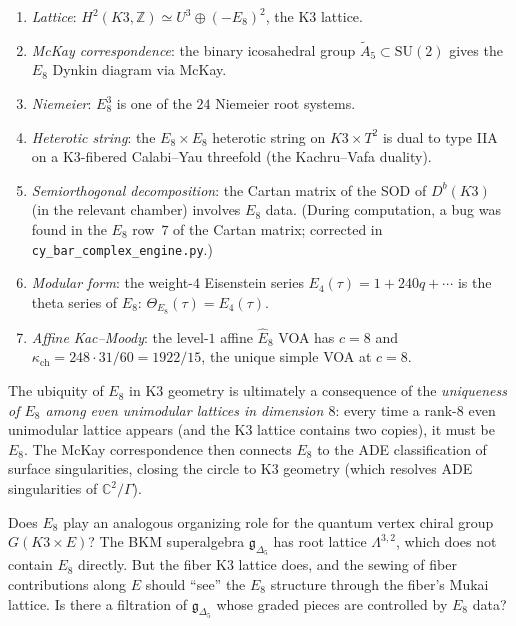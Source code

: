 \documentclass[11pt]{article}
\newcommand{\fg}{\mathfrak{g}}
\newcommand{\C}{\mathbb{C}}
\newcommand{\Z}{\mathbb{Z}}
\begin{document}
\begin{enumerate}[label=(\roman*)]
\item \emph{Lattice}: $H^2(K3, \Z) \simeq U^3 \oplus (-E_8)^2$, the K3 lattice.
\item \emph{McKay correspondence}: the binary icosahedral group $\widetilde{A}_5 \subset \mathrm{SU}(2)$ gives the $E_8$ Dynkin diagram via McKay.
\item \emph{Niemeier}: $E_8^3$ is one of the $24$ Niemeier root systems.
\item \emph{Heterotic string}: the $E_8 \times E_8$ heterotic string on $K3 \times T^2$ is dual to type IIA on a K3-fibered Calabi--Yau threefold (the Kachru--Vafa duality).
\item \emph{Semiorthogonal decomposition}: the Cartan matrix of the SOD of $D^b(K3)$ (in the relevant chamber) involves $E_8$ data. (During computation, a bug was found in the $E_8$ row~$7$ of the Cartan matrix; corrected in \texttt{cy\_bar\_complex\_engine.py}.)
\item \emph{Modular form}: the weight-$4$ Eisenstein series $E_4(\tau) = 1 + 240 q + \cdots$ is the theta series of $E_8$: $\Theta_{E_8}(\tau) = E_4(\tau)$.
\item \emph{Affine Kac--Moody}: the level-$1$ affine $\widehat{E}_8$ VOA has $c = 8$ and $\kappa_{\mathrm{ch}} = 248 \cdot 31/60 = 1922/15$, the unique simple VOA at $c = 8$.
\end{enumerate}

The ubiquity of $E_8$ in K3 geometry is ultimately a consequence of the \emph{uniqueness of $E_8$ among even unimodular lattices in dimension $8$}: every time a rank-$8$ even unimodular lattice appears (and the K3 lattice contains two copies), it must be $E_8$. The McKay correspondence then connects $E_8$ to the ADE classification of surface singularities, closing the circle to K3 geometry (which resolves ADE singularities of $\C^2/\Gamma$).

\begin{question}
Does $E_8$ play an analogous organizing role for the quantum vertex chiral group $G(K3 \times E)$? The BKM superalgebra $\fg_{\Delta_5}$ has root lattice $\Lambda^{3,2}$, which does not contain $E_8$ directly. But the fiber K3 lattice does, and the sewing of fiber contributions along $E$ should ``see'' the $E_8$ structure through the fiber's Mukai lattice. Is there a filtration of $\fg_{\Delta_5}$ whose graded pieces are controlled by $E_8$ data?
\end{question}
\end{document}
